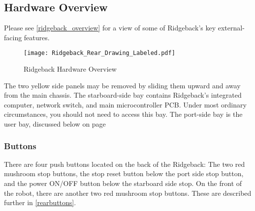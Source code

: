 \documentclass[]{clearpath-latex/clearpath-manual}
\begin{document}
\pagebreak[4]
\subsection{Hardware Overview}

Please see \autoref{ridgeback_overview} for a view of some of Ridgeback's key external-facing features.

\begin{figure}[h]
  \centering
  \texttt{[image: Ridgeback\_Rear\_Drawing\_Labeled.pdf]}
  \caption{Ridgeback Hardware Overview}
  \label{ridgeback_overview}
\end{figure}

The two yellow side panels may be removed by sliding them upward and away from the main chassis. The starboard-side bay contains Ridgeback's integrated computer, network switch, and main microcontroller PCB. Under most ordinary circumstances, you should not need to access this bay. The port-side bay is the user bay, discussed below on page \pageref{userbay}


\pagebreak[4]
\subsubsection{Buttons}

There are four push buttons located on the back of the Ridgeback: The two red mushroom stop buttons, the stop reset button below the port side stop button, and the power ON/OFF button below the starboard side stop. On the front of the robot, there are another two red mushroom stop buttons.  These are described further in \autoref{rearbuttons}.
\end{document}
